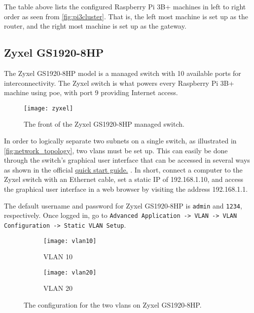 The table above lists the configured Raspberry Pi 3B+ machines in left to right order as seen from \ref{fig:pi3cluster}. That is, the left most machine is set up as the router, and the right most machine is set up as the gateway.




\subsection{Zyxel GS1920-8HP} \label{zyxel}

The Zyxel GS1920-8HP model is a managed switch with 10 available ports for interconnectivity. The Zyxel switch is what powers every Raspberry Pi 3B+ machine using \gls{poe}, with port 9 providing Internet access.

\begin{figure}[H]
    \centering
    \texttt{[image: zyxel]}
    \captionsetup{width=1.0\linewidth}
    \caption{The front of the Zyxel GS1920-8HP managed switch.}
    \label{fig:zyxel}
\end{figure}

In order to logically separate two subnets on a single switch, as illustrated in \ref{fig:network_topology}, two \gls{vlan}s must be set up. This can easily be done through the switch's graphical user interface that can be accessed in several ways as shown in the official \href{https://www.zyxel.com/support/download_landing/product/gs1920_series_18.shtml?c=gb&l=en&pid=20130521174252&tab=Quick_Start_Guide&pname=GS1920%20Series}{quick start guide.} \todo{footnote}. In short, connect a computer to the Zyxel switch with an Ethernet cable, set a static IP of 192.168.1.10, and access the graphical user interface in a web browser by visiting the address 192.168.1.1.

The default username and password for Zyxel GS1920-8HP is \lstinline{admin} and \lstinline{1234}, respectively. Once logged in, go to \lstinline{Advanced Application -> VLAN -> VLAN Configuration -> Static VLAN Setup}.

\begin{figure}[H]
    \centering
    \begin{subfigure}{0.5\linewidth}
        \centering
        \texttt{[image: vlan10]}
        \caption{VLAN 10}
        \label{fig:vlan10}
    \end{subfigure}%
    \begin{subfigure}{0.5\linewidth}
        \centering
        \texttt{[image: vlan20]}
        \caption{VLAN 20}
        \label{fig:vlan20}
    \end{subfigure}
    \caption{The configuration for the two \gls{vlan}s on Zyxel GS1920-8HP.}
    \label{fig:vlans}
\end{figure}

